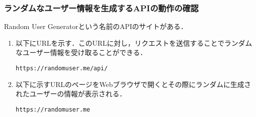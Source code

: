 \documentclass[12pt]{jsarticle}
\begin{document}
\subsubsection{ランダムなユーザー情報を生成するAPIの動作の確認}\label{sec:api}
Random User Generatorという名前のAPIのサイトがある．
\begin{enumerate}
\item 以下にURLを示す．このURLに対し，リクエストを送信することでランダムなユーザー情報を受け取ることができる．
\begin{verbatim}
https://randomuser.me/api/
\end{verbatim}
\item 以下に示すURLのページをWebブラウザで開くとその際にランダムに生成されたユーザーの情報が表示される．
\begin{verbatim}
https://randomuser.me
\end{verbatim}
\end{enumerate}
\end{document}
